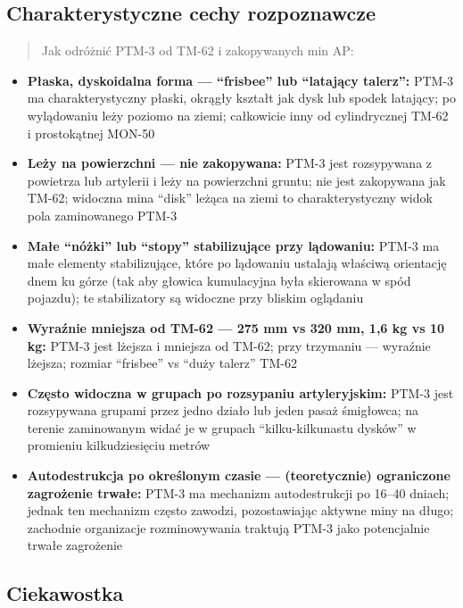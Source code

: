 \documentclass[12pt,oneside]{book}
\providecommand{\tightlist}{%
  \setlength{\itemsep}{0pt}\setlength{\parskip}{0pt}}
\begin{document}
\subsection{Charakterystyczne cechy
rozpoznawcze}\label{charakterystyczne-cechy-rozpoznawcze-131}

\begin{quote}
Jak odróżnić PTM-3 od TM-62 i zakopywanych min AP:
\end{quote}

\begin{itemize}
\tightlist
\item
  \textbf{Płaska, dyskoidalna forma --- ``frisbee'' lub ``latający
  talerz'':} PTM-3 ma charakterystyczny płaski, okrągły kształt jak dysk
  lub spodek latający; po wylądowaniu leży poziomo na ziemi; całkowicie
  inny od cylindrycznej TM-62 i prostokątnej MON-50
\item
  \textbf{Leży na powierzchni --- nie zakopywana:} PTM-3 jest
  rozsypywana z powietrza lub artylerii i leży na powierzchni gruntu;
  nie jest zakopywana jak TM-62; widoczna mina ``disk'' leżąca na ziemi
  to charakterystyczny widok pola zaminowanego PTM-3
\item
  \textbf{Małe ``nóżki'' lub ``stopy'' stabilizujące przy lądowaniu:}
  PTM-3 ma małe elementy stabilizujące, które po lądowaniu ustalają
  właściwą orientację dnem ku górze (tak aby głowica kumulacyjna była
  skierowana w spód pojazdu); te stabilizatory są widoczne przy bliskim
  oglądaniu
\item
  \textbf{Wyraźnie mniejsza od TM-62 --- 275 mm vs 320 mm, 1,6 kg vs 10
  kg:} PTM-3 jest lżejsza i mniejsza od TM-62; przy trzymaniu ---
  wyraźnie lżejsza; rozmiar ``frisbee'' vs ``duży talerz'' TM-62
\item
  \textbf{Często widoczna w grupach po rozsypaniu artyleryjskim:} PTM-3
  jest rozsypywana grupami przez jedno działo lub jeden pasaż śmigłowca;
  na terenie zaminowanym widać je w grupach ``kilku-kilkunastu dysków''
  w promieniu kilkudziesięciu metrów
\item
  \textbf{Autodestrukcja po określonym czasie --- (teoretycznie)
  ograniczone zagrożenie trwałe:} PTM-3 ma mechanizm autodestrukcji po
  16--40 dniach; jednak ten mechanizm często zawodzi, pozostawiając
  aktywne miny na długo; zachodnie organizacje rozminowywania traktują
  PTM-3 jako potencjalnie trwałe zagrożenie
\end{itemize}

\subsection{Ciekawostka}\label{ciekawostka-131}
\end{document}
